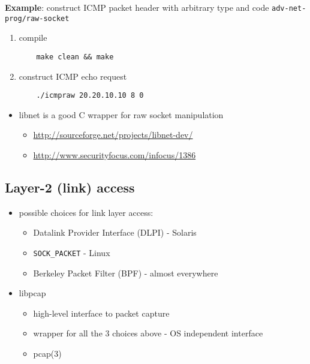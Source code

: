{\bf Example}: construct ICMP packet header with arbitrary type and code
	 \texttt{adv-net-prog/raw-socket}
\begin{enumerate}
	 \item compile
\begin{verbatim}
    make clean && make
\end{verbatim}
	 \item construct ICMP echo request
\begin{verbatim}
    ./icmpraw 20.20.10.10 8 0
\end{verbatim}
\end{enumerate}


\begin{itemize}
\item libnet is a good C wrapper for raw socket manipulation
  \begin{itemize}
    \item \url{http://sourceforge.net/projects/libnet-dev/}
    \item \url{http://www.securityfocus.com/infocus/1386}
  \end{itemize}
\end{itemize}




\subsection{Layer-2 (link) access}

\begin{itemize}
  \item possible choices for link layer access:
    \begin{itemize}
      \item Datalink Provider Interface (DLPI) - Solaris
      \item \texttt{SOCK\_PACKET} - Linux
      \item Berkeley Packet Filter (BPF) - almost everywhere
    \end{itemize}
  \item libpcap
    \begin{itemize}
      \item high-level interface to packet capture
        \item wrapper for all the 3 choices above - OS independent interface
      \item pcap(3)
    \end{itemize}
\end{itemize}



